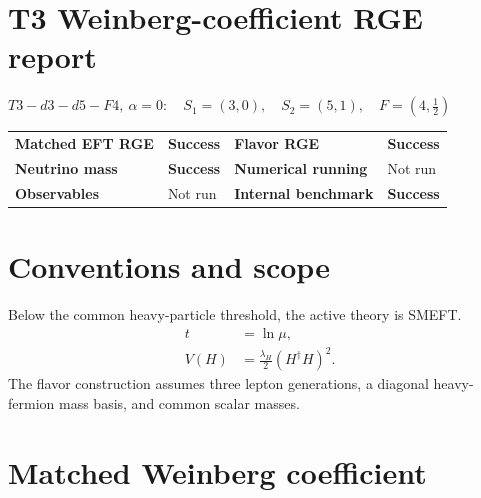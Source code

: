\documentclass[10pt]{article}
\begin{document}
\section*{T3 Weinberg-coefficient RGE report}
\noindent $T3-d3-d5-F4,\ \alpha=0:\quad S_1=(3,0),\quad S_2=(5,1),\quad F=(4,\frac{1}{2})$
\par\medskip
\begin{center}
\begin{tabular}{>{\bfseries}l l >{\bfseries}l l}
\toprule
Matched EFT RGE & \textcolor{green!45!black}{\textbf{Success}} & Flavor RGE & \textcolor{green!45!black}{\textbf{Success}} \\
Neutrino mass & \textcolor{green!45!black}{\textbf{Success}} & Numerical running & \textcolor{black!55}{Not run} \\
Observables & \textcolor{black!55}{Not run} & Internal benchmark & \textcolor{green!45!black}{\textbf{Success}} \\
\bottomrule
\end{tabular}
\end{center}
\section{Conventions and scope}
Below the common heavy-particle threshold, the active theory is SMEFT.
\begin{align*}
t&=\ln\mu,\\
V(H)&=\frac{\lambda_H}{2}(H^\dagger H)^2.
\end{align*}
The flavor construction assumes three lepton generations, a diagonal heavy-fermion mass basis, and common scalar masses.
\section{Matched Weinberg coefficient}
\noindent{}\par
\smallskip
\end{document}
